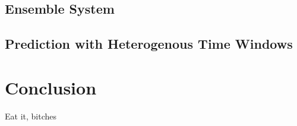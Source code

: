 \documentclass[10pt]{article}
\begin{document}
\subsection{Ensemble System}



\subsection{Prediction with Heterogenous Time Windows}



\section{Conclusion}
Eat it, bitches


\nocite{Moreno03}



\end{document}
